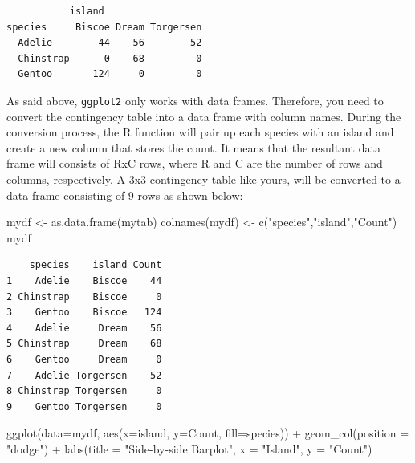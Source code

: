\documentclass[
  letterpaper,
]{book}
\newenvironment{Shaded}{\begin{snugshade}}{\end{snugshade}}
\newcommand{\AttributeTok}[1]{\textcolor[rgb]{0.40,0.45,0.13}{#1}}
\newcommand{\FunctionTok}[1]{\textcolor[rgb]{0.28,0.35,0.67}{#1}}
\newcommand{\NormalTok}[1]{\textcolor[rgb]{0.00,0.23,0.31}{#1}}
\newcommand{\OtherTok}[1]{\textcolor[rgb]{0.00,0.23,0.31}{#1}}
\newcommand{\SpecialCharTok}[1]{\textcolor[rgb]{0.37,0.37,0.37}{#1}}
\newcommand{\StringTok}[1]{\textcolor[rgb]{0.13,0.47,0.30}{#1}}
\begin{document}
\begin{verbatim}
           island
species     Biscoe Dream Torgersen
  Adelie        44    56        52
  Chinstrap      0    68         0
  Gentoo       124     0         0
\end{verbatim}

As said above, \texttt{ggplot2} only works with data frames. Therefore,
you need to convert the contingency table into a data frame with column
names. During the conversion process, the R function will pair up each
species with an island and create a new column that stores the count. It
means that the resultant data frame will consists of RxC rows, where R
and C are the number of rows and columns, respectively. A 3x3
contingency table like yours, will be converted to a data frame
consisting of 9 rows as shown below:

\begin{Shaded}
\begin{Highlighting}[]
\NormalTok{mydf }\OtherTok{\textless{}{-}} \FunctionTok{as.data.frame}\NormalTok{(mytab)}
\FunctionTok{colnames}\NormalTok{(mydf) }\OtherTok{\textless{}{-}} \FunctionTok{c}\NormalTok{(}\StringTok{"species"}\NormalTok{,}\StringTok{"island"}\NormalTok{,}\StringTok{"Count"}\NormalTok{)}
\NormalTok{mydf}
\end{Highlighting}
\end{Shaded}

\begin{verbatim}
    species    island Count
1    Adelie    Biscoe    44
2 Chinstrap    Biscoe     0
3    Gentoo    Biscoe   124
4    Adelie     Dream    56
5 Chinstrap     Dream    68
6    Gentoo     Dream     0
7    Adelie Torgersen    52
8 Chinstrap Torgersen     0
9    Gentoo Torgersen     0
\end{verbatim}

\begin{Shaded}
\begin{Highlighting}[]
\FunctionTok{ggplot}\NormalTok{(}\AttributeTok{data=}\NormalTok{mydf, }\FunctionTok{aes}\NormalTok{(}\AttributeTok{x=}\NormalTok{island, }\AttributeTok{y=}\NormalTok{Count, }\AttributeTok{fill=}\NormalTok{species)) }\SpecialCharTok{+}
  \FunctionTok{geom\_col}\NormalTok{(}\AttributeTok{position =} \StringTok{"dodge"}\NormalTok{) }\SpecialCharTok{+}
  \FunctionTok{labs}\NormalTok{(}\AttributeTok{title =} \StringTok{"Side{-}by{-}side Barplot"}\NormalTok{, }\AttributeTok{x =} \StringTok{"Island"}\NormalTok{, }\AttributeTok{y =} \StringTok{"Count"}\NormalTok{)}
\end{Highlighting}
\end{Shaded}
\end{document}
